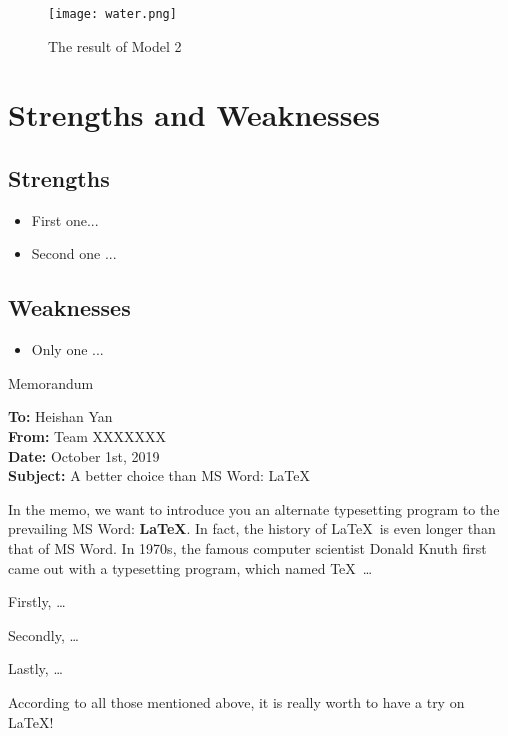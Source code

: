 \documentclass[12pt]{article}  %
\begin{document}
\begin{figure}[htbp]
\centering
\texttt{[image: water.png]}
\caption{The result of Model 2}\label{fig:result}
\end{figure}

\section{Strengths and Weaknesses}
\subsection{Strengths}
\begin{itemize}
    \item First one...
    \item Second one ...
\end{itemize}

\subsection{Weaknesses}
\begin{itemize}
    \item Only one ...
 \end{itemize}


\begin{letter}{Memorandum}
\begin{flushleft}  %
\textbf{To:} Heishan Yan\\
\textbf{From:} Team XXXXXXX\\
\textbf{Date:} October 1st, 2019\\
\textbf{Subject:} A better choice than MS Word: \LaTeX
\end{flushleft}

In the memo, we want to introduce you an alternate typesetting program to the prevailing MS Word: \textbf{\LaTeX}. In fact, the history of \LaTeX\ is even longer than that of MS Word. In 1970s, the famous computer scientist Donald Knuth first came out with a typesetting program, which named \TeX\ \ldots

Firstly, \ldots

Secondly, \ldots

Lastly, \ldots

According to all those mentioned above, it is really worth to have a try on \LaTeX! 
\end{letter}
\end{document}
